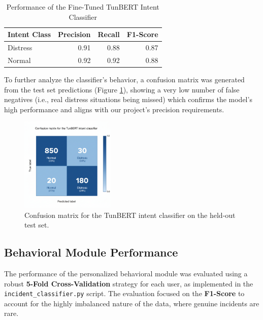 \documentclass[12pt,a4paper,oneside,english]{book}
\begin{document}
{%
\begin{table}[h!]
    \centering
    \caption{Performance of the Fine-Tuned TunBERT Intent Classifier}
    \label{tab:nlp_results}
    \begin{tabular}{lrrr}
        \hline
        \textbf{Intent Class} & \textbf{Precision} & \textbf{Recall} & \textbf{F1-Score} \\ \hline
        Distress              & 0.91               & 0.88            & 0.87              \\
        Normal                & 0.92               & 0.92            & 0.88              \\ \hline
    \end{tabular}
\end{table}

To further analyze the classifier's behavior, a confusion matrix was generated from the test set predictions (Figure \ref{fig:nlp_confusion_matrix}),  showing a very low number of false 
negatives (i.e., real distress situations being missed) which confirms the model's high performance and aligns with our project's precision requirements.

\begin{figure}[h!]
    \centering
    \includegraphics[width=0.4\textwidth]{images/confusionmatrix_nlp.png}
    \caption{Confusion matrix for the TunBERT intent classifier on the held-out test set.}
    \label{fig:nlp_confusion_matrix}
\end{figure}

\subsection{Behavioral Module Performance}
\label{subsec:behavioral_results}

The performance of the personalized behavioral module was evaluated using a robust \textbf{5-Fold Cross-Validation} strategy for each user, as implemented in the \texttt{incident\_classifier.py} script. The evaluation focused on the \textbf{F1-Score} to account for the highly imbalanced nature of the data, where genuine incidents are rare.

}
\end{document}
